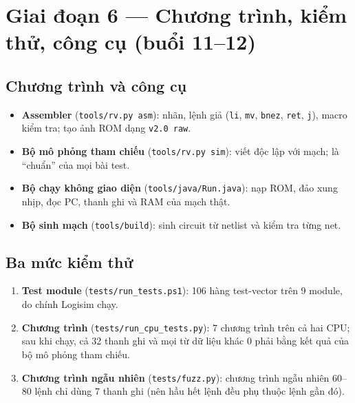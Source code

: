 \documentclass[11pt,a4paper]{article}
\begin{document}
\section{Giai đoạn 6 --- Chương trình, kiểm thử, công cụ (buổi 11--12)}

\subsection{Chương trình và công cụ}
\begin{itemize}
  \item \textbf{Assembler} (\texttt{tools/rv.py asm}): nhãn, lệnh giả (\texttt{li}, \texttt{mv}, \texttt{bnez}, \texttt{ret}, \texttt{j}), macro kiểm tra; tạo ảnh ROM dạng \texttt{v2.0 raw}.
  \item \textbf{Bộ mô phỏng tham chiếu} (\texttt{tools/rv.py sim}): viết độc lập với mạch; là ``chuẩn'' của mọi bài test.
  \item \textbf{Bộ chạy không giao diện} (\texttt{tools/java/Run.java}): nạp ROM, đảo xung nhịp, đọc PC, thanh ghi và RAM của mạch thật.
  \item \textbf{Bộ sinh mạch} (\texttt{tools/build}): sinh circuit từ netlist và kiểm tra từng net.
\end{itemize}

\subsection{Ba mức kiểm thử}
\begin{enumerate}
  \item \textbf{Test module} (\texttt{tests/run\_tests.ps1}): 106 hàng test-vector trên 9 module, do chính Logisim chạy.
  \item \textbf{Chương trình} (\texttt{tests/run\_cpu\_tests.py}): 7 chương trình trên cả hai CPU; sau khi chạy, cả 32 thanh ghi và mọi từ dữ liệu khác 0 phải bằng kết quả của bộ mô phỏng tham chiếu.
  \item \textbf{Chương trình ngẫu nhiên} (\texttt{tests/fuzz.py}): chương trình ngẫu nhiên 60--80 lệnh chỉ dùng 7 thanh ghi (nên hầu hết lệnh đều phụ thuộc lệnh gần đó).
\end{enumerate}
\end{document}
